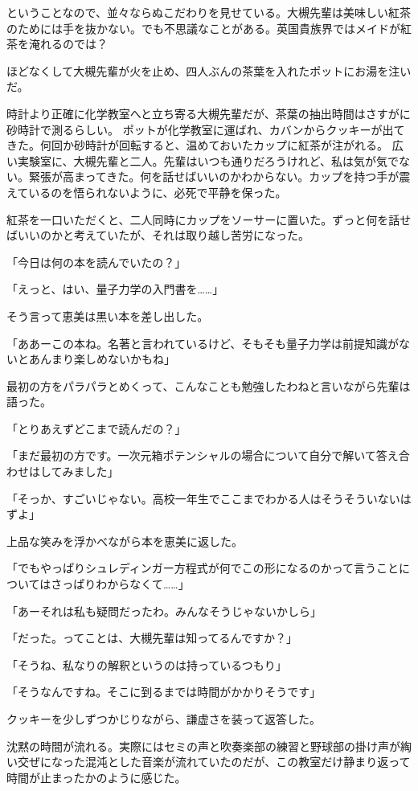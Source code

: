 \documentclass[a4paper,dvipdfmx,12pt]{jsarticle}
\begin{document}
ということなので、並々ならぬこだわりを見せている。大槻先輩は美味しい紅茶のためには手を抜かない。でも不思議なことがある。英国貴族界ではメイドが紅茶を淹れるのでは？

ほどなくして大槻先輩が火を止め、四人ぶんの茶葉を入れたポットにお湯を注いだ。


時計より正確に化学教室へと立ち寄る大槻先輩だが、茶葉の抽出時間はさすがに砂時計で測るらしい。
ポットが化学教室に運ばれ、カバンからクッキーが出てきた。何回か砂時計が回転すると、温めておいたカップに紅茶が注がれる。
広い実験室に、大槻先輩と二人。先輩はいつも通りだろうけれど、私は気が気でない。緊張が高まってきた。何を話せばいいのかわからない。カップを持つ手が震えているのを悟られないように、必死で平静を保った。

\vspace{0.2in}

紅茶を一口いただくと、二人同時にカップをソーサーに置いた。ずっと何を話せばいいのかと考えていたが、それは取り越し苦労になった。

「今日は何の本を読んでいたの？」


「えっと、はい、量子力学の入門書を……」

そう言って恵美は黒い本を差し出した。

「ああーこの本ね。名著と言われているけど、そもそも量子力学は前提知識がないとあんまり楽しめないかもね」

最初の方をパラパラとめくって、こんなことも勉強したわねと言いながら先輩は語った。

「とりあえずどこまで読んだの？」

「まだ最初の方です。一次元箱ポテンシャルの場合について自分で解いて答え合わせはしてみました」

「そっか、すごいじゃない。高校一年生でここまでわかる人はそうそういないはずよ」

上品な笑みを浮かべながら本を恵美に返した。

「でもやっぱりシュレディンガー方程式が何でこの形になるのかって言うことについてはさっぱりわからなくて……」

「あーそれは私も疑問だったわ。みんなそうじゃないかしら」

「だった。ってことは、大槻先輩は知ってるんですか？」

「そうね、私なりの解釈というのは持っているつもり」

「そうなんですね。そこに到るまでは時間がかかりそうです」

クッキーを少しずつかじりながら、謙虚さを装って返答した。

沈黙の時間が流れる。実際にはセミの声と吹奏楽部の練習と野球部の掛け声が綯い交ぜになった混沌とした音楽が流れていたのだが、この教室だけ静まり返って時間が止まったかのように感じた。
\end{document}
